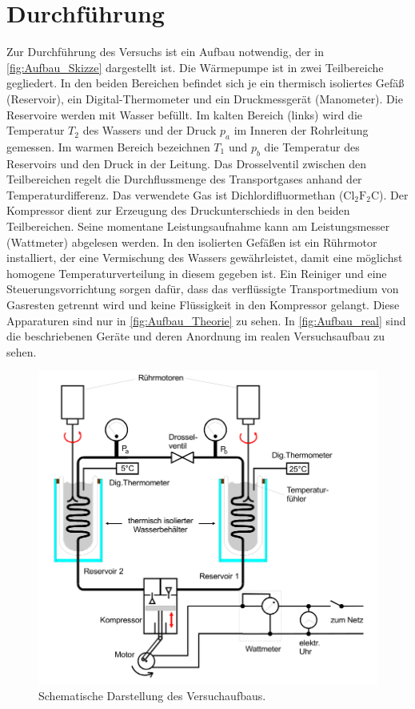 \section{Durchführung}
\label{sec:Durchführung}
Zur Durchführung des Versuchs ist ein Aufbau notwendig, der in \autoref{fig:Aufbau_Skizze} dargestellt ist.
Die Wärmepumpe ist in zwei Teilbereiche gegliedert. In den beiden Bereichen befindet sich je ein thermisch isoliertes Gefäß (Reservoir), ein Digital-Thermometer und 
ein Druckmessgerät (Manometer). Die Reservoire werden mit Wasser befüllt. Im \dq kalten\dq\: Bereich (links) wird die Temperatur $T_2$ des Wassers und der Druck $p_a$ im Inneren der Rohrleitung 
gemessen. Im \dq warmen\dq\: Bereich bezeichnen $T_1$ und $p_b$ die Temperatur des Reservoirs und den Druck in der Leitung. Das Drosselventil zwischen den Teilbereichen regelt 
die Durchflussmenge des Transportgases anhand der Temperaturdifferenz. Das verwendete Gas ist Dichlordifluormethan ($\text{Cl}_2\text{F}_2\text{C}$). Der Kompressor dient zur Erzeugung des 
Druckunterschieds in den beiden Teilbereichen. Seine momentane Leistungsaufnahme kann am Leistungsmesser (Wattmeter) abgelesen werden. In den isolierten Gefäßen ist ein Rührmotor 
installiert, der eine Vermischung des Wassers gewährleistet, damit eine möglichst homogene Temperaturverteilung in diesem gegeben ist. Ein \dq Reiniger\dq \: und eine 
Steuerungsvorrichtung sorgen dafür, dass das verflüssigte Transportmedium von Gasresten getrennt wird und keine Flüssigkeit in den Kompressor gelangt. Diese Apparaturen sind 
nur in \autoref{fig:Aufbau_Theorie} zu sehen. In \autoref{fig:Aufbau_real} sind die beschriebenen Geräte und deren Anordnung im realen Versuchsaufbau zu sehen.

\begin{figure}
    \centering
    \caption{Schematische Darstellung des Versuchaufbaus. \cite{v206}}
    \label{fig:Aufbau_Skizze}
    \includegraphics[width=.5\textwidth]{content/Aufbau_Skizze.png}
\end{figure}

